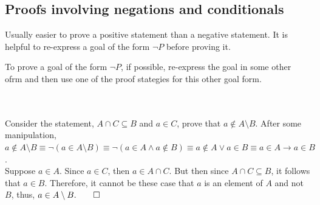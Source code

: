 \documentclass[../setup.tex]{subfiles}
\begin{document}
\subsection{Proofs involving negations and conditionals}
Usually easier to prove a positive statement than a negative statement. It is helpful to re-express a goal of the form $\lnot P$ before proving it.
\begin{theorem}
	To prove a goal of the form $\lnot{P}$, if possible, re-express the goal in some other ofrm and then use one of the proof stategies for this other goal form. 
\end{theorem}
\phantom \\ \\
Consider the statement, $A \cap C \subseteq B$ and $a \in C$, prove that $a \notin A \setminus B$. After some manipulation, $a \notin A \setminus B \equiv \lnot(a \in A \setminus B) \equiv \lnot (a \in A \land a \notin B) \equiv a \notin A \lor a \in B \equiv a \in A \rightarrow a \in B$. \\
Suppose $a \in A$. Since $a \in C$, then $a \in A \cap C$. But then since $A \cap C \subseteq B$, it follows that $a \in B$. Therefore, it cannot be these case that $a$ is an element of $A$ and not $B$, thus, $a \in A \setminus B. \qed$ 
\end{document}
